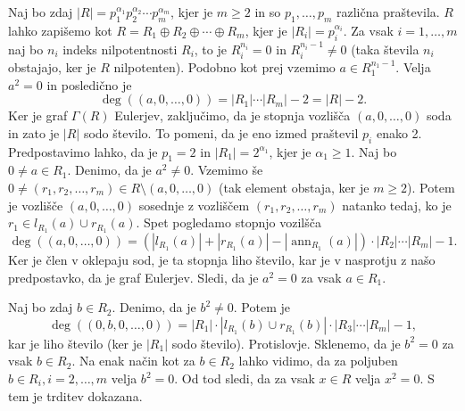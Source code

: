 \documentclass[a4paper, 12pt]{amsart}
\theoremstyle{definition} %
\theoremstyle{plain} %
\DeclareMathOperator{\ann}{ann}
\begin{document}
Naj bo zdaj $|R| = p_1^{\alpha_1} p_2^{\alpha_2} \cdots p_m^{\alpha_m}$, kjer je $m \ge 2$ in so $p_1,\dots,p_m$ različna praštevila. $R$ lahko zapišemo kot $R= R_1 \oplus R_2 \oplus \cdots \oplus R_m$, kjer je $|R_i|  = p_i^{\alpha_i}$. Za vsak $i=1,\dots, m$ naj bo $n_i$ indeks nilpotentnosti $R_i$, to je $R_i^{n_i} =0 $ in $R_i^{n_i-1} \neq 0$ (taka števila $n_i$ obstajajo, ker je $R$ nilpotenten). Podobno kot prej vzemimo $a\in R_1^{n_1 - 1}$. Velja $a^2 = 0$ in posledično je 
$$
\deg((a,0,\dots,0)) = |R_1|\cdots|R_m| - 2 = |R| - 2.
$$ 
Ker je graf $\Gamma(R)$ Eulerjev, zaključimo, da je stopnja vozlišča $(a,0,\dots,0)$ soda in zato je $|R | $ sodo število. To pomeni, da je eno izmed praštevil $p_i$ enako 2. Predpostavimo lahko, da je $p_1 = 2$ in $|R_1| = 2^{\alpha_1}$, kjer je $\alpha_1 \ge 1$. Naj bo $0\neq a\in R_1$. Denimo, da je $a^2 \neq 0$. Vzemimo še $0\neq (r_1,r_2,\dots,r_m)\in R\setminus (a,0,\dots,0)$ (tak element obstaja, ker je $m\ge 2$). Potem je vozlišče $(a,0,\dots,0)$ sosednje z vozliščem $(r_1,r_2,\dots,r_m)$ natanko tedaj, ko je $r_1\in l_{R_1}(a)\cup r_{R_1}(a)$. Spet pogledamo stopnjo vozilšča 
$$
\deg((a,0,\dots,0)) = (|l_{R_1}(a) | + |r_{R_1}(a)| - |\ann_{R_1}(a)|)\cdot |R_2|\cdots |R_m| - 1.
$$
Ker je člen v oklepaju sod, je ta stopnja liho število, kar je v nasprotju z našo predpostavko, da je graf Eulerjev. Sledi, da je $a^2 = 0$ za vsak $a\in R_1$.

Naj bo zdaj $b\in R_2$. Denimo, da je $b^2 \neq 0$. Potem je 
$$
\deg((0,b,0,\dots,0)) = |R_1|\cdot|l_{R_1}(b) \cup r_{R_1}(b)| \cdot |R_3|\cdots|R_m| - 1,
$$
kar je liho število (ker je $|R_1|$ sodo število). Protislovje. Sklenemo, da je $b^2 = 0$ za vsak $b\in R_2$. Na enak način kot za $b\in R_2$ lahko vidimo, da za poljuben $b\in R_i, i=2,\dots,m$ velja $b^2=0$. Od tod sledi, da za vsak $x\in R$ velja $x^2 = 0$. S tem je trditev dokazana.

\endproof
\end{document}
